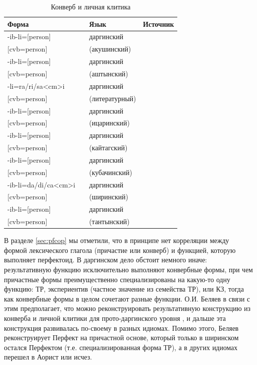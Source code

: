 \begin{table}[ht]
\caption{Конверб и личная клитика}
\label{tab:cvbpers}
\vspace{0.2cm}
\begin{center}
\begin{tabular}{ll|ll}
\multicolumn{2}{l|}{Форма} & Язык      & Источник   \\ \hline
-ib-li={[}person{]}  	&		&	даргинский	&	\citep{belyaev2018}	\\
{[}cvb=person{]}	&		&	(акушинский)	&		\\
-ib-li={[}person{]}	&		&	даргинский	&	\citep{belyaev2018}	\\
{[}cvb=person{]}	&		&	(аштынский)	&		\\
-li=ra/ri/sa<cm>i 	&		&	даргинский	&	\citep{mutalov2018}	\\
{[}cvb=person{]}	&		&	(литературный)	&		\\
-ib-li={[}person{]} 	&		&	даргинский	&	\citep{belyaev2018}	\\
{[}cvb=person{]}	&		&	(ицаринский)	&		\\
-ib-li={[}person{]} 	&		&	даргинский	&	\citep{belyaev2018}	\\
{[}cvb=person{]}	&		&	(кайтагский)	&		\\
-ib-li={[}person{]} 	&		&	даргинский	&	\citep{belyaev2018}	\\
{[}cvb=person{]}	&		&	(кубачинский)	&		\\
-ib-li=da/di/ca<cm>i 	&		&	даргинский	&	\citep{belyaev2018}	\\
{[}cvb=person{]}	&		&	(ширинский)	&		\\
-ib-li={[}person{]} 	&		&	даргинский	&	\citep{belyaev2018}	\\
{[}cvb=person{]}	&		&	(тантынский)	&		\\
\end{tabular}
\end{center}
\end{table}

В разделе \ref{sec:pfcop} мы отметили, что в принципе нет корреляции между формой лексического глагола (причастие или конверб) и функцией, которую выполняет перфектоид. В даргинском дело обстоит немного иначе: результативную функцию исключительно выполняют конвербные формы, при чем причастные формы преимущественно специализированы на какую-то одну функцию: ТР, экспериентив (частное значение из семейства ТР), или КЗ, тогда как конвербные формы в целом сочетают разные функции. О.И. Беляев в связи с этим предполагает, что можно реконструировать результативную конструкцию из конверба и личной клитики для прото-даргинского уровня \citep[107, 113]{belyaev2018}, и дальше эта конструкция развивалась по-своему в разных идиомах. Помимо этого, Беляев реконструирует Перфект на причастной основе, который только в ширинском остался Перфектом (т.е. специализированная форма ТР), а в других идиомах перешел в Аорист или исчез. 

